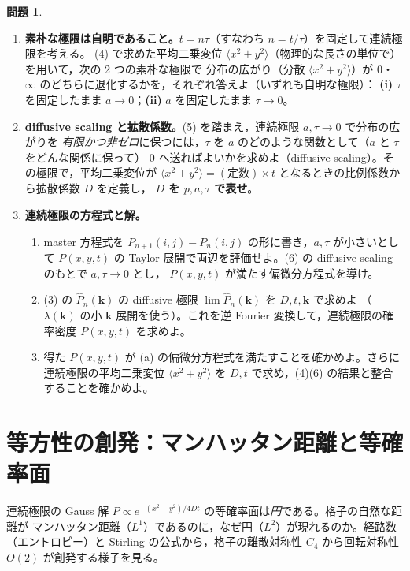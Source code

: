 \documentclass[dvipdfmx, uplatex]{jsarticle}
\newcommand{\bk}{\bm{k}}
\theoremstyle{definition}
\newtheorem*{prob}{問題}
\begin{document}
\begin{prob}
\begin{enumerate}[start=5]
\item \textbf{素朴な極限は自明であること。}$t=n\tau$（すなわち $n=t/\tau$）を固定して連続極限を考える。
(4) で求めた平均二乗変位 $\langle x^2+y^2\rangle$（物理的な長さの単位で）を用いて，次の 2 つの素朴な極限で
分布の広がり（分散 $\langle x^2+y^2\rangle$）が $0$・$\infty$ のどちらに退化するかを，それぞれ答えよ（いずれも自明な極限）：
\textbf{(i)} $\tau$ を固定したまま $a\to0$；\textbf{(ii)} $a$ を固定したまま $\tau\to0$。
\item \textbf{diffusive scaling と拡散係数。}(5) を踏まえ，連続極限 $a,\tau\to0$ で分布の広がりを
\emph{有限かつ非ゼロ}に保つには，$\tau$ を $a$ のどのような関数として（$a$ と $\tau$ をどんな関係に保って）
$0$ へ送ればよいかを求めよ（diffusive scaling）。その極限で，平均二乗変位が
$\langle x^2+y^2\rangle=(\text{定数})\times t$ となるときの比例係数から拡散係数 $D$ を定義し，
\textbf{$D$ を $p,a,\tau$ で表せ}。
\item \textbf{連続極限の方程式と解。}
\begin{enumerate}
\item master 方程式を $P_{n+1}(i,j)-P_n(i,j)$ の形に書き，$a,\tau$ が小さいとして
$P(x,y,t)$ の Taylor 展開で両辺を評価せよ。(6) の diffusive scaling のもとで $a,\tau\to0$ とし，
$P(x,y,t)$ が満たす偏微分方程式を導け。
\item (3) の $\hat P_n(\bk)$ の diffusive 極限 $\displaystyle\lim\hat P_n(\bk)$ を $D,t,\bk$ で求めよ
（$\lambda(\bk)$ の小 $\bk$ 展開を使う）。これを逆 Fourier 変換して，連続極限の確率密度 $P(x,y,t)$ を求めよ。
\item 得た $P(x,y,t)$ が (a) の偏微分方程式を満たすことを確かめよ。さらに連続極限の平均二乗変位
$\langle x^2+y^2\rangle$ を $D,t$ で求め，(4)(6) の結果と整合することを確かめよ。
\end{enumerate}
\end{enumerate}
\end{prob}

\section{等方性の創発：マンハッタン距離と等確率面}
連続極限の Gauss 解 $P\propto e^{-(x^2+y^2)/4Dt}$ の等確率面は\emph{円}である。格子の自然な距離が
マンハッタン距離（$L^1$）であるのに，なぜ円（$L^2$）が現れるのか。経路数（エントロピー）と
Stirling の公式から，格子の離散対称性 $C_4$ から回転対称性 $O(2)$ が創発する様子を見る。
\end{document}
